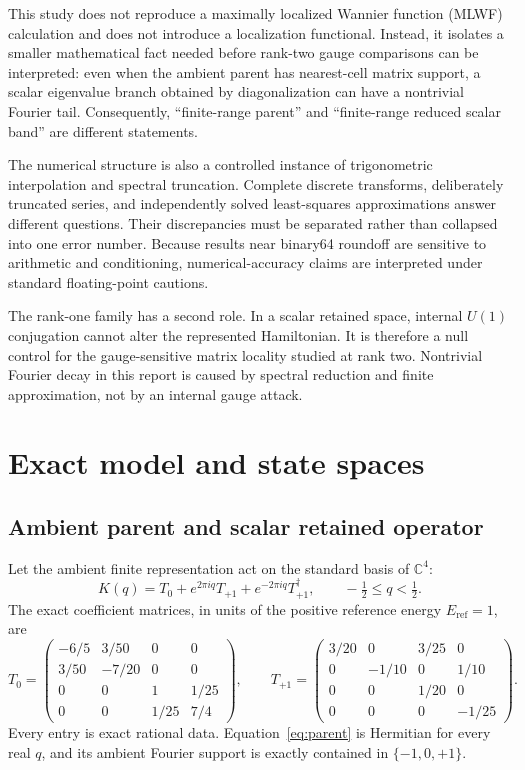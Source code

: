 \documentclass[11pt]{article}
\newcommand{\eref}{E_{\mathrm{ref}}}
\newcommand{\C}{\mathbb{C}}
\begin{document}
This study does not reproduce a maximally localized Wannier function (MLWF) calculation
and does not introduce a localization functional.  Instead, it isolates a smaller
mathematical fact needed before rank-two gauge comparisons can be interpreted: even when
the ambient parent has nearest-cell matrix support, a scalar eigenvalue branch obtained
by diagonalization can have a nontrivial Fourier tail.  Consequently, ``finite-range
parent'' and ``finite-range reduced scalar band'' are different statements.

The numerical structure is also a controlled instance of trigonometric interpolation
and spectral truncation\cite{trefethen2000}.  Complete discrete transforms, deliberately
truncated series, and independently solved least-squares approximations answer different
questions.  Their discrepancies must be separated rather than collapsed into one error
number.  Because results near binary64 roundoff are sensitive to arithmetic and
conditioning, numerical-accuracy claims are interpreted under standard floating-point
cautions\cite{higham2002}.

The rank-one family has a second role.  In a scalar retained space, internal $U(1)$
conjugation cannot alter the represented Hamiltonian.  It is therefore a null control
for the gauge-sensitive matrix locality studied at rank two.  Nontrivial Fourier decay
in this report is caused by spectral reduction and finite approximation, not by an
internal gauge attack.

\section{Exact model and state spaces}

\subsection{Ambient parent and scalar retained operator}

Let the ambient finite representation act on the standard basis of $\C^4$:
\begin{equation}
 K(q)=T_0+e^{2\pi iq}T_{+1}+e^{-2\pi iq}T_{+1}^{\dagger},
 \qquad -\tfrac12\le q<\tfrac12.
 \label{eq:parent}
\end{equation}
The exact coefficient matrices, in units of the positive reference energy
$\eref=1$, are
\begin{equation}
T_0=\begin{pmatrix}
-6/5&3/50&0&0\\
3/50&-7/20&0&0\\
0&0&1&1/25\\
0&0&1/25&7/4
\end{pmatrix},\qquad
T_{+1}=\begin{pmatrix}
3/20&0&3/25&0\\
0&-1/10&0&1/10\\
0&0&1/20&0\\
0&0&0&-1/25
\end{pmatrix}.
\label{eq:parent-coefficients}
\end{equation}
Every entry is exact rational data.  Equation~\eqref{eq:parent} is Hermitian for every
real $q$, and its ambient Fourier support is exactly contained in
$\{-1,0,+1\}$.
\end{document}
